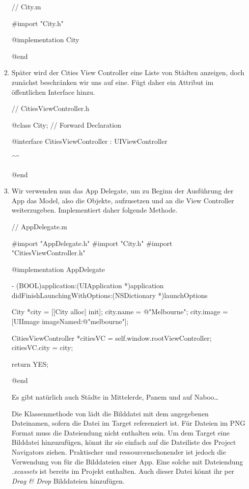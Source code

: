 \documentclass[parskip=half, final]{scrreprt}
\begin{document}
\begin{lecture}
\begin{enumerate}
\begin{objclst}
// City.m

#import "City.h"

@implementation City

@end
\end{objclst}

\item Später wird der Cities View Controller eine Liste von Städten anzeigen, doch zunächst beschränken wir uns auf eine. Fügt daher ein Attribut  im öffentlichen Interface hinzu.

\begin{objclst}
// CitiesViewController.h

@class City; // Forward Declaration

@interface CitiesViewController : UIViewController

^^

@end
\end{objclst}

\item Wir verwenden nun das App Delegate, um zu Beginn der Ausführung der App das Model, also die  Objekte, aufzusetzen und an die View Controller weiterzugeben. Implementiert daher folgende  Methode.

\begin{objclst}
// AppDelegate.m

#import "AppDelegate.h"
#import "City.h"
#import "CitiesViewController.h"

@implementation AppDelegate

- (BOOL)application:(UIApplication *)application didFinishLaunchingWithOptions:(NSDictionary *)launchOptions
{
    City *city = [[City alloc] init];
    city.name = @"Melbourne";
    city.image = [UIImage imageNamed:@"melbourne"];

    CitiesViewController *citiesVC = self.window.rootViewController;
    citiesVC.city = city;
    
    return YES;
}

@end
\end{objclst}

Es gibt natürlich auch Städte in Mittelerde, Panem und auf Naboo…

 Die Klassenmethode  von  lädt die Bilddatei mit dem angegebenen Dateinamen, sofern die Datei im Target referenziert ist. Für Dateien im PNG Format muss die Dateiendung nicht enthalten sein. Um dem Target eine Bilddatei hinzuzufügen, könnt ihr sie einfach auf die Dateiliste des Project Navigators ziehen. Praktischer und ressourcenschonender ist jedoch die Verwendung von  für die Bilddateien einer App. Eine solche mit Dateiendung \emph{.xcassets} ist bereits im Projekt enthalten. Auch dieser Datei könnt ihr per \emph{Drag \& Drop} Bilddateien hinzufügen.


\end{enumerate}
\end{lecture}
\end{document}
